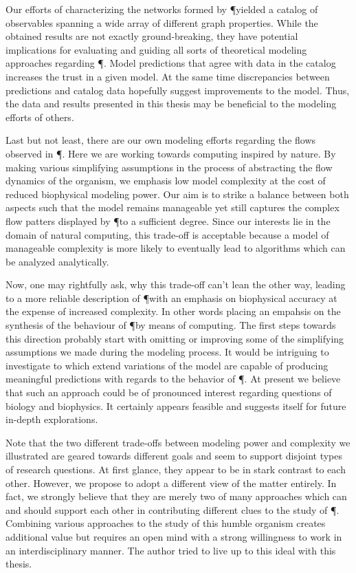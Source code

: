 	Our efforts of characterizing the networks formed by \P yielded a catalog of observables spanning a wide array of different graph properties. While the obtained results are not exactly ground-breaking, they have potential implications for evaluating and guiding all sorts of theoretical modeling approaches regarding \P. Model predictions that agree with data in the catalog increases the trust in a given model. At the same time discrepancies between predictions and catalog data hopefully suggest improvements to the model. Thus, the data and results presented in this thesis may be beneficial to the modeling efforts of others.

	Last but not least, there are our own modeling efforts regarding the flows observed in \P. Here we are working towards computing inspired by nature. By making various simplifying assumptions in the process of abstracting the flow dynamics of the organism, we emphasis low model complexity at the cost of reduced biophysical modeling power. Our aim is to strike a balance between both aspects such that the model remains manageable yet still captures the complex flow patters displayed by \P to a sufficient degree. Since our interests lie in the domain of natural computing, this trade-off is acceptable because a model of manageable complexity is more likely to eventually lead to algorithms which can be analyzed analytically. 

	Now, one may rightfully ask, why this trade-off can't lean the other way, leading to a more reliable description of \P with an emphasis on biophysical accuracy at the expense of increased complexity. In other words placing an empahsis on the synthesis of the behaviour of \P by means of computing. The first steps towards this direction probably start with omitting or improving some of the simplifying assumptions we made during the modeling process. It would be intriguing to investigate to which extend variations of the model are capable of producing meaningful predictions with regards to the behavior of \P. At present we believe that such an approach could be of pronounced interest regarding questions of biology and biophysics. It certainly appears feasible and suggests itself for future in-depth explorations.

	Note that the two different trade-offs between modeling power and complexity we illustrated are geared towards different goals and seem to support disjoint types of research questions. At first glance, they appear to be in stark contrast to each other. However, we propose to adopt a different view of the matter entirely. In fact, we strongly believe that they are merely two of many approaches which can and should support each other in contributing different clues to the study of \P. Combining various approaches to the study of this humble organism creates additional value but requires an open mind with a strong willingness to work in an interdisciplinary manner. The author tried to live up to this ideal with this thesis.

